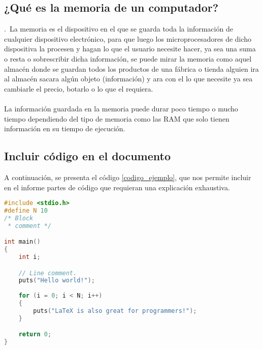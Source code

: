 \documentclass{article}
\begin{document}
\subsection{¿Qué es la memoria de un computador?}
 .\
	La memoria es el dispositivo en el que se guarda toda la información de cualquier dispositivo electrónico, para que luego los microprocesadores de dicho dispositiva la procesen y hagan lo que el usuario necesite hacer, ya sea una suma o resta o sobrescribir dicha información, se puede mirar la memoria como aquel almacén donde se guardan todos los productos de una fábrica o tienda alguien ira al almacén sacara algún objeto (información) y ara con el lo que necesite ya sea cambiarle el precio, botarlo o lo que el requiera.
	\\\\
La información guardada en la memoria puede durar poco tiempo o mucho tiempo dependiendo del tipo de memoria como las RAM que solo  tienen información en su tiempo de ejecución.


\subsection{Incluir código en el documento}
%
A continuación, se presenta el código \ref{codigo_ejemplo}, que nos permite incluir en el informe partes de código que requieran una explicación exhaustiva.
\begin{lstlisting}[language=C++, caption=Ejemplo, label=codigo_ejemplo]
#include <stdio.h>
#define N 10
/* Block
 * comment */

int main()
{
    int i;

    // Line comment.
    puts("Hello world!");
    
    for (i = 0; i < N; i++)
    {
        puts("LaTeX is also great for programmers!");
    }

    return 0;
}
\end{lstlisting}







\end{document}

